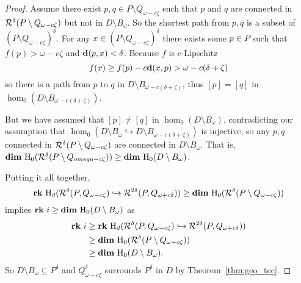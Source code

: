 \begin{proof}
  Assume there exist $p,q \in P\setminus Q_{\omega-c\zeta}$ such that $p$ and $q$ are connected in $\mathcal{R}^\delta(P\setminus Q_{\omega-c\zeta})$ but not in $D\setminus B_\omega$.
  So the shortest path from $p, q$ is a subset of $(P\setminus Q_{\omega-c\zeta})^\delta$.
  For any $x\in (P\setminus Q_{\omega-c\zeta})^\delta$ there exists some $p\in P$ such that $f(p) > \omega - c\zeta$ and $\mathbf{d}(p,x) < \delta$.
  Because $f$ is $c$-Lipschitz
  \[ f(x)\geq f(p) - c\mathbf{d}(x,p) > \omega - c(\delta+\zeta)\]
  so there is a path from $p$ to $q$ in $D\setminus B_{\omega-c(\delta+\zeta)}$, thus $[p] = [q]$ in $\hom_0(D\setminus B_{\omega-c(\delta+\zeta)})$.

  But we have assumed that $[p]\neq[q]$ in $\hom_0(D\setminus B_\omega)$, contradicting our assumption that $\hom_0(D\setminus B_\omega\hookrightarrow D\setminus B_{\omega-c(\delta+\zeta)})$ is injective, so any $p,q$ connected in $\mathcal{R}^\delta(P\setminus Q_{\omega-c\zeta})$ are connected in $D\setminus B_\omega$.
  That is, $\mathbf{dim}~\mathrm{H}_0(\mathcal{R}^\delta(P\setminus Q_{omega-c\zeta}))\geq \mathbf{dim}~\mathrm{H}_0(D\setminus B_\omega)$.

  Putting it all together,
  \[ \mathbf{rk}~\mathrm{H}_d(\mathcal{R}^\delta(P, Q_{\omega -c\zeta})\hookrightarrow \mathcal{R}^{2\delta}(P, Q_{\omega+c\delta})) \geq \mathbf{dim}~\mathrm{H}_0(\mathcal{R}^\delta(P\setminus Q_{\omega-c\zeta}))\]
  implies $\mathbf{rk}~i\geq\mathbf{dim}~\mathrm{H}_0(D\setminus B_\omega)$ as
  \begin{align*}
    \mathbf{rk}~i &\geq \mathbf{rk}~\mathrm{H}_d(\mathcal{R}^\delta(P, Q_{\omega -c\zeta})\hookrightarrow \mathcal{R}^{2\delta}(P, Q_{\omega+c\delta}))\\
      &\geq \mathbf{dim}~\mathrm{H}_0(\mathcal{R}^\delta(P\setminus Q_{\omega-c\zeta}))\\
      &\geq \mathbf{dim}~\mathrm{H}_0(D\setminus B_\omega).
  \end{align*}
  So $D\setminus B_\omega\subseteq P^\delta$ and $Q_{\omega-c\zeta}^\delta$ surrounds $P^\delta$ in $D$ by Theorem~\ref{thm:geo_tcc}.

\end{proof}

